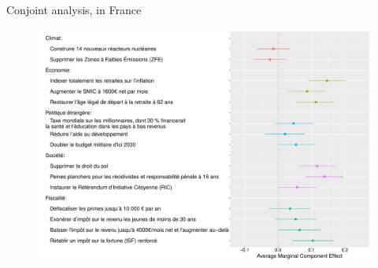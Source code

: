\documentclass[aspectratio=169,xcolor=dvipsnames, 11pt,mathserif]{beamer}
\begin{document}
\begin{frame}{Conjoint analysis,  in France\label{conjoint_countries} \hyperlink{conjoint_country}{}} 
    \begin{figure} \vspace{-.14cm}
\includegraphics[height=.97\textheight]{../figures/all/conjoint_FR.pdf}
\end{figure}
\end{frame}
\end{document}
